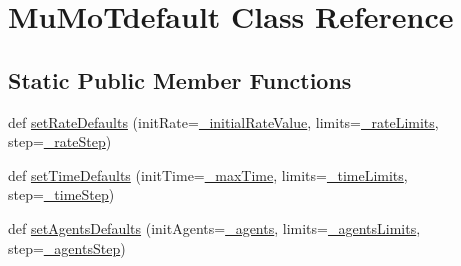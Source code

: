 \hypertarget{class_mu_mo_t_1_1_mu_mo_t_1_1_mu_mo_tdefault}{}\section{Mu\+Mo\+Tdefault Class Reference}
\label{class_mu_mo_t_1_1_mu_mo_t_1_1_mu_mo_tdefault}
\subsection*{Static Public Member Functions}
\begin{DoxyCompactItemize}
\item 
def \hyperlink{class_mu_mo_t_1_1_mu_mo_t_1_1_mu_mo_tdefault_a3ce665e68925e7c173896a5101b16dfa}{set\+Rate\+Defaults} (init\+Rate=\hyperlink{class_mu_mo_t_1_1_mu_mo_t_1_1_mu_mo_tdefault_adbfda01292fc4c7936ed57523fd625c7}{\+\_\+initial\+Rate\+Value}, limits=\hyperlink{class_mu_mo_t_1_1_mu_mo_t_1_1_mu_mo_tdefault_a89f788e3d778e1e0554c57832275d484}{\+\_\+rate\+Limits}, step=\hyperlink{class_mu_mo_t_1_1_mu_mo_t_1_1_mu_mo_tdefault_aa45ec6be070d9881c9c018a533f6573c}{\+\_\+rate\+Step})
\item 
def \hyperlink{class_mu_mo_t_1_1_mu_mo_t_1_1_mu_mo_tdefault_a4be4721ce31fd644cb66ae8af0dd41fe}{set\+Time\+Defaults} (init\+Time=\hyperlink{class_mu_mo_t_1_1_mu_mo_t_1_1_mu_mo_tdefault_a46ffe9aa10cdab976a57d8ba1d3cd2f6}{\+\_\+max\+Time}, limits=\hyperlink{class_mu_mo_t_1_1_mu_mo_t_1_1_mu_mo_tdefault_a2208809031da7f126f4416fb64cdb026}{\+\_\+time\+Limits}, step=\hyperlink{class_mu_mo_t_1_1_mu_mo_t_1_1_mu_mo_tdefault_ad83203bcc6032b30e6f5b57f8982af9e}{\+\_\+time\+Step})
\item 
def \hyperlink{class_mu_mo_t_1_1_mu_mo_t_1_1_mu_mo_tdefault_a390063ec9e63f433bf06fa72f608b7e4}{set\+Agents\+Defaults} (init\+Agents=\hyperlink{class_mu_mo_t_1_1_mu_mo_t_1_1_mu_mo_tdefault_a42f05ec35f2b5b564e064bb19ebd36cf}{\+\_\+agents}, limits=\hyperlink{class_mu_mo_t_1_1_mu_mo_t_1_1_mu_mo_tdefault_a01360abcb6eddb212c38b66852c35e17}{\+\_\+agents\+Limits}, step=\hyperlink{class_mu_mo_t_1_1_mu_mo_t_1_1_mu_mo_tdefault_a55b7c54066a90600796a35e96ef5743b}{\+\_\+agents\+Step})
\end{DoxyCompactItemize}
